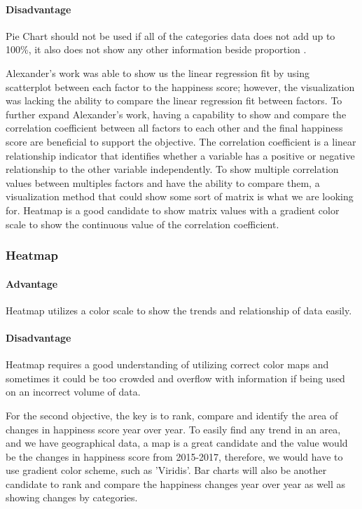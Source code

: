 \documentclass[11pt,twocolumn]{article}
\begin{document}
\paragraph{Disadvantage} Pie Chart should not be used if all of the categories data does not add up to 100\%, it also does not show any other information beside proportion \cite{piechart}.

Alexander's work was able to show us the linear regression fit by using scatterplot between each factor to the happiness score; however, the visualization was lacking the ability to compare the linear regression fit between factors. To further expand Alexander's work, having a capability to show and compare the correlation coefficient between all factors to each other and the final happiness score are beneficial to support the objective. The correlation coefficient is a linear relationship indicator that identifies whether a variable has a positive or negative relationship to the other variable independently. To show multiple correlation values between multiples factors and have the ability to compare them, a visualization method that could show some sort of matrix is what we are looking for. Heatmap is a good candidate to show matrix values with a gradient color scale to show the continuous value of the correlation coefficient.

\subsubsection{Heatmap} 
\paragraph{Advantage} Heatmap utilizes a color scale to show the trends and relationship of data easily.
\paragraph{Disadvantage} Heatmap requires a good understanding of utilizing correct color maps and sometimes it could be too crowded and overflow with information if being used on an incorrect volume of data.

For the second objective, the key is to rank, compare and identify the area of changes in happiness score year over year. To easily find any trend in an area, and we have geographical data, a map is a great candidate and the value would be the changes in happiness score from 2015-2017, therefore, we would have to use gradient color scheme, such as 'Viridis'. Bar charts will also be another candidate to rank and compare the happiness changes year over year as well as showing changes by categories.
\end{document}
